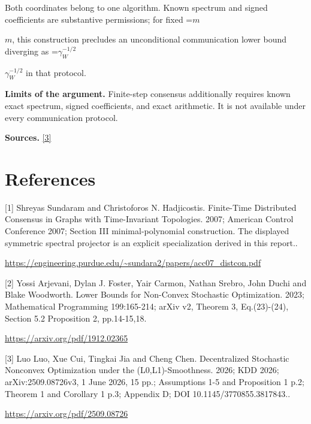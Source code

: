 \documentclass[10pt,a4paper]{article}
\newcommand{\AtlasMath}[1]{\par\begingroup\centering\setbox0=\hbox{$\displaystyle #1$}\ifdim\wd0>1.4\linewidth\typeout{ATLAS WIDE FORMULA: \the\wd0}\fi\ifdim\wd0>\linewidth\resizebox{\linewidth}{!}{\box0}\else\box0\fi\par\endgroup}
\newcommand{\AtlasInlineMath}[1]{\begingroup\setbox0=\hbox{$#1$}\ifdim\wd0>.4\linewidth\endgroup\AtlasMath{#1}\else\endgroup$#1$\fi}
\begin{document}
Both coordinates belong to one algorithm. Known spectrum and signed coefficients are substantive permissions; for fixed \AtlasInlineMath{m}, this construction precludes an unconditional communication lower bound diverging as \AtlasInlineMath{\gamma_W^{-1/2}} in that protocol.

\textbf{Limits of the argument.} Finite-step consensus additionally requires known exact spectrum, signed coefficients, and exact arithmetic. It is not available under every communication protocol.

\textbf{Sources.} \href{https://arxiv.org/pdf/2509.08726}{[3]}

\section{References}
[1] Shreyas Sundaram and Christoforos N. Hadjicostis. Finite-Time Distributed Consensus in Graphs with Time-Invariant Topologies. 2007; American Control Conference 2007; Section III minimal-polynomial construction. The displayed symmetric spectral projector is an explicit specialization derived in this report..

\url{https://engineering.purdue.edu/~sundara2/papers/acc07_distcon.pdf}

[2] Yossi Arjevani, Dylan J. Foster, Yair Carmon, Nathan Srebro, John Duchi and Blake Woodworth. Lower Bounds for Non-Convex Stochastic Optimization. 2023; Mathematical Programming 199:165-214; arXiv v2, Theorem 3, Eq.(23)-(24), Section 5.2 Proposition 2, pp.14-15,18.

\url{https://arxiv.org/pdf/1912.02365}

[3] Luo Luo, Xue Cui, Tingkai Jia and Cheng Chen. Decentralized Stochastic Nonconvex Optimization under the (L0,L1)-Smoothness. 2026; KDD 2026; arXiv:2509.08726v3, 1 June 2026, 15 pp.; Assumptions 1-5 and Proposition 1 p.2; Theorem 1 and Corollary 1 p.3; Appendix D; DOI 10.1145/3770855.3817843..

\url{https://arxiv.org/pdf/2509.08726}
\end{document}
